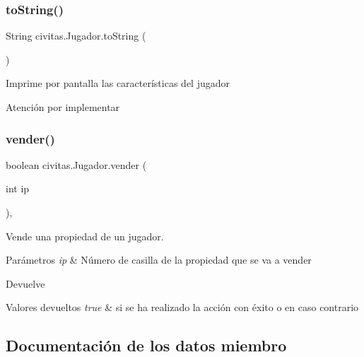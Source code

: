 \subsubsection{\texorpdfstring{to\+String()}{toString()}}
{\footnotesize\ttfamily String civitas.\+Jugador.\+to\+String (\begin{DoxyParamCaption}{ }\end{DoxyParamCaption})\hspace{0.3cm}{\ttfamily [inline]}}

Imprime por pantalla las características del jugador \begin{DoxyWarning}{Atención}
por implementar 
\end{DoxyWarning}
\mbox{\label{classcivitas_1_1Jugador_aa9a90b759adaccfd58e322c5518bb0f9}} 
\subsubsection{\texorpdfstring{vender()}{vender()}}
{\footnotesize\ttfamily boolean civitas.\+Jugador.\+vender (\begin{DoxyParamCaption}\item[{int}]{ip }\end{DoxyParamCaption})\hspace{0.3cm}{\ttfamily [inline]}, {\ttfamily [package]}}

Vende una propiedad de un jugador. 
\begin{DoxyParams}{Parámetros}
{\em ip} & Número de casilla de la propiedad que se va a vender \\
\hline
\end{DoxyParams}
\begin{DoxyReturn}{Devuelve}

\end{DoxyReturn}

\begin{DoxyRetVals}{Valores devueltos}
{\em true} & si se ha realizado la acción con éxito o  en caso contrario \\
\hline
\end{DoxyRetVals}


\subsection{Documentación de los datos miembro}
\mbox{\label{classcivitas_1_1Jugador_accf59fcd81d2ef278ff30ec2d94459f7}} 
